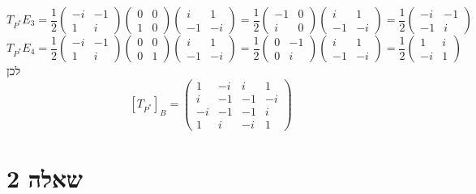 \[
	T_{P^*} E_3 = \frac{1}{2}
	\begin{pmatrix} -i & -1 \\ 1 & i \end{pmatrix}
	\begin{pmatrix} 0 & 0 \\ 1 & 0 \end{pmatrix}
	\begin{pmatrix} i & 1 \\ -1 & -i \end{pmatrix}
	= \frac{1}{2}
	\begin{pmatrix} -1 & 0 \\ i & 0 \end{pmatrix}
	\begin{pmatrix} i & 1 \\ -1 & -i \end{pmatrix}
	= \frac{1}{2} \begin{pmatrix} -i & -1 \\ -1 & i \end{pmatrix}
\]
\[
	T_{P^*} E_4 = \frac{1}{2}
	\begin{pmatrix} -i & -1 \\ 1 & i \end{pmatrix}
	\begin{pmatrix} 0 & 0 \\ 0 & 1 \end{pmatrix}
	\begin{pmatrix} i & 1 \\ -1 & -i \end{pmatrix}
	= \frac{1}{2}
	\begin{pmatrix} 0 & -1 \\ 0 & i \end{pmatrix}
	\begin{pmatrix} i & 1 \\ -1 & -i \end{pmatrix}
	= \frac{1}{2} \begin{pmatrix} 1 & i \\ -i & 1 \end{pmatrix}
\]
לכן 
\[
	[T_{P^*}]_B = \begin{pmatrix}
		1 & -i & i & 1 \\
		i & -1 & -1 & -i \\
		-i & -1 & -1 & i \\
		1 & i & -i & 1
	\end{pmatrix}
\]

\section{שאלה 2}
